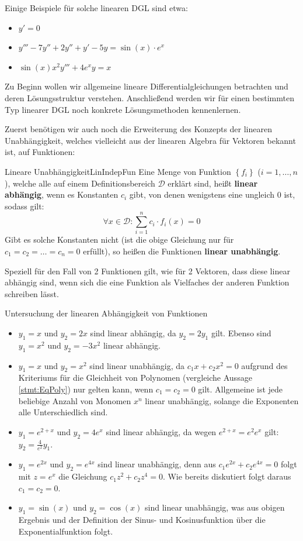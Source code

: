 Einige Beispiele für solche linearen DGL sind etwa:

\begin{itemize}
    \item $y'=0$
    \item $y'''-7y''+2y''+y'-5y=\sin(x)\cdot e^x$
    \item $\sin(x)x^2y'''+4e^x y = x$
\end{itemize}

Zu Beginn wollen wir allgemeine lineare Differentialgleichungen betrachten und deren Lösungsstruktur verstehen. Anschließend werden wir für einen bestimmten Typ linearer DGL noch konkrete Lösungsmethoden kennenlernen.

Zuerst benötigen wir auch noch die Erweiterung des Konzepts der linearen Unabhängigkeit, welches vielleicht aus der linearen Algebra für Vektoren bekannt ist, auf Funktionen:

\begin{definition}{Lineare Unabhängigkeit}{LinIndepFun}
    Eine Menge von Funktion $\left\lbrace f_i \right\rbrace$ ($i=1,\dots,n$), welche alle auf einem Definitionsbereich $\mathcal{D}$ erklärt sind, heißt \textbf{linear abhängig}, wenn es Konstanten $c_i$ gibt, von denen wenigstens eine ungleich $0$ ist, sodass gilt:
    $$
        \forall x \in \mathcal{D}: \sum\limits_{i=1}^n c_i \cdot f_i(x) = 0
    $$
    Gibt es solche Konstanten nicht (ist die obige Gleichung nur für $c_1=c_2=\dots=c_n=0$ erfüllt), so heißen die Funktionen \textbf{linear unabhängig}.
\end{definition}

Speziell für den Fall von 2 Funktionen gilt, wie für 2 Vektoren, dass diese linear abhängig sind, wenn sich die eine Funktion als Vielfaches der anderen Funktion schreiben lässt.

\begin{example}{Untersuchung der linearen Abhängigkeit von Funktionen}{}
    \begin{itemize}
        \item $y_1=x$ und $y_2=2x$ sind linear abhängig, da $y_2 = 2 y_1$ gilt. Ebenso sind $y_1=x^2$ und $y_2=-3x^2$ linear abhängig.
        \item $y_1=x$ und $y_2=x^2$ sind linear unabhängig, da $c_1 x + c_2 x^2 = 0$ aufgrund des Kriteriums für die Gleichheit von Polynomen (vergleiche Aussage \ref{stmt:EqPoly}) nur gelten kann, wenn $c_1=c_2=0$ gilt. Allgemeine ist jede beliebige Anzahl von Monomen $x^n$ linear unabhängig, solange die Exponenten alle Unterschiedlich sind.
        \item $y_1=e^{2+x}$ und $y_2=4e^x$ sind linear abhängig, da wegen $e^{2+x} = e^2 e^x$ gilt: $y_2 = \frac{4}{e^2} y_1$.
        \item $y_1=e^{2x}$ und $y_2=e^{4x}$ sind linear unabhängig, denn aus $c_1 e^{2x} + c_2 e^{4x}=0$ folgt mit $z=e^x$ die Gleichung $c_1 z^2 + c_2 z^4 = 0$. Wie bereits diskutiert folgt daraus $c_1=c_2=0$.
        \item $y_1=\sin(x)$ und $y_2 = \cos(x)$ sind linear unabhängig, was aus obigen Ergebnis und der Definition der Sinus- und Kosinusfunktion über die Exponentialfunktion folgt.
    \end{itemize}
\end{example}


